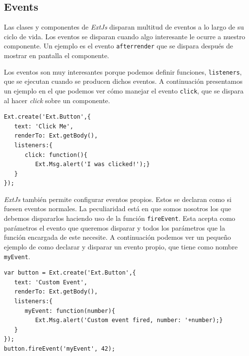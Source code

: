 	\subsection{Events}
		Las clases y componentes de \emph{ExtJs} disparan multitud de eventos a lo largo de su ciclo de vida. Los eventos se disparan cuando algo
		interesante le ocurre a nuestro componente. Un ejemplo es el evento \texttt{afterrender} que se dispara después de mostrar en pantalla
		el componente.
		\par
		Los eventos son muy interesantes porque podemos definir funciones, \texttt{listeners}, que se ejecutan cuando se producen dichos
		eventos. A continuación presentamos un ejemplo en el que podemos ver cómo manejar el evento \texttt{click}, que se dispara al hacer
		\emph{click} sobre un componente. 
		\begin{lstlisting}[style=myJs]
Ext.create('Ext.Button',{
   text: 'Click Me',
   renderTo: Ext.getBody(),
   listeners:{
      click: function(){
         Ext.Msg.alert('I was clicked!');}
   }
});
		\end{lstlisting}
		\par
		\emph{ExtJs} también permite configurar eventos propios. Estos se declaran como si fuesen eventos normales. La peculiaridad está en que somos
		nosotros los que debemos dispararlos haciendo uso de la función \texttt{fireEvent}. Esta acepta como parámetros el evento que queremos
		disparar y todos los parámetros que la función encargada de este necesite. A continuación podemos ver un pequeño ejemplo de como
		declarar y disparar un evento propio, que tiene como nombre \texttt{myEvent}.
		\begin{lstlisting}[style=myJs]
var button = Ext.create('Ext.Button',{
   text: 'Custom Event',
   renderTo: Ext.getBody(),
   listeners:{
      myEvent: function(number){
         Ext.Msg.alert('Custom event fired, number: '+number);}
   }
});
button.fireEvent('myEvent', 42);
		\end{lstlisting}
